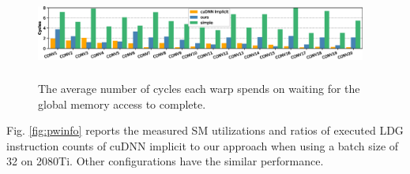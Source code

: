 \begin{figure}[t!]
    \centering
    \includegraphics[width=0.97\textwidth,height=3cm]{./figure/longscore.eps}
    \vspace{-3mm}
    \caption{The average number of cycles each warp spends on waiting for the global memory access to complete.}
    \label{fig:stalllongscore}
\end{figure}

Fig. \ref{fig:pwinfo} reports the measured SM utilizations and ratios of executed LDG instruction counts of cuDNN implicit to our approach when using a batch size of 32 on 2080Ti. Other configurations have the similar performance.


